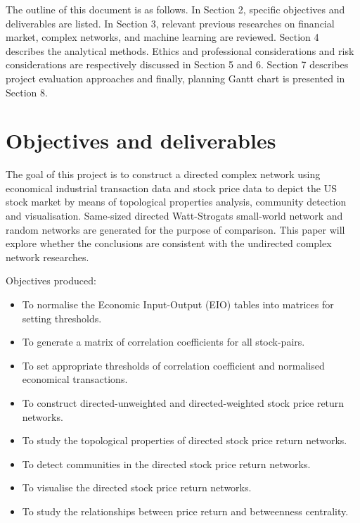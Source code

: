The outline of this document is as follows. In Section 2, specific objectives and deliverables are listed. In Section 3, relevant previous researches on financial market, complex networks, and machine learning are reviewed. Section 4 describes the analytical methods. Ethics and professional considerations and risk considerations are respectively discussed in Section 5 and 6. Section 7 describes project evaluation approaches and finally, planning Gantt chart is presented in Section 8.


\section{Objectives and deliverables}

The goal of this project is to construct a directed complex network using economical industrial transaction data and stock price data to depict the US stock market by means of topological properties analysis, community detection and visualisation. Same-sized directed Watt-Strogats small-world network and random networks are generated for the purpose of comparison. This paper will explore whether the conclusions are consistent with the undirected complex network researches.

\vline

Objectives produced:

\begin{itemize}
	\item To normalise the Economic Input-Output (EIO) tables into matrices for setting thresholds.
	\item To generate a matrix of correlation coefficients for all stock-pairs.
	\item To set appropriate thresholds of correlation coefficient and normalised economical transactions.
	\item To construct directed-unweighted and directed-weighted stock price return networks.
	\item To study the topological properties of directed stock price return networks.
	\item To detect communities in the directed stock price return networks.
	\item To visualise the directed stock price return networks.
	\item To study the relationships between price return and betweenness centrality.
\end{itemize}

